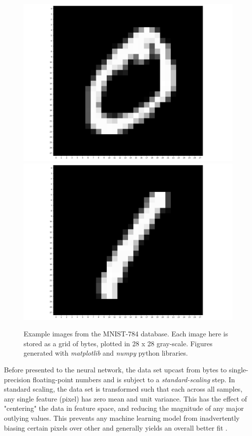 \documentclass{IEEEtran}
\begin{document}
\begin{figure}[h]
    \centering
    \includegraphics[scale=0.1]{fig/baseline1.png}\hfill
    \includegraphics[scale=0.1]{fig/baseline3.png}
    \caption{Example images from the MNIST-784 database. Each image here is stored as a grid of bytes, plotted in 28 x 28 gray-scale. Figures generated with \textit{matplotlib} and \textit{numpy} python libraries. \cite{Matplotlib,Numpy}}
    \label{fig:Mnist784}
\end{figure}

Before presented to the neural network, the data set upcast from bytes to single-precision floating-point numbers and is subject to a \textit{standard-scaling} step. In standard scaling, the data set is transformed such that each across all samples, any single feature (pixel) has zero mean and unit variance. This has the effect of "centering" the data in feature space, and reducing the magnitude of any major outlying values. This prevents any machine learning model from inadvertently biasing certain pixels over other and generally yields an overall better fit \cite{Geron,Loy,James,Sklearn}.
\end{document}
